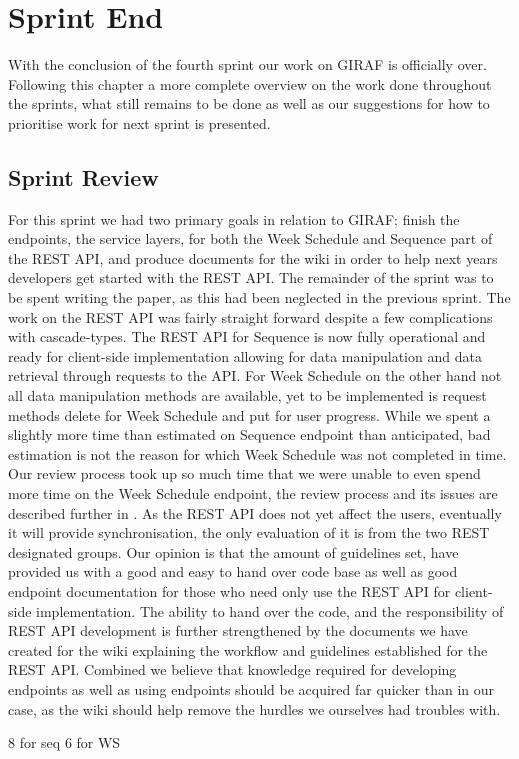 \chapter{Sprint End}
With the conclusion of the fourth sprint our work on GIRAF is officially over.
Following this chapter a more complete overview on the work done throughout the sprints, what still remains to be done as well as our suggestions for how to prioritise work for next sprint is presented.

\section{Sprint Review}
For this sprint we had two primary goals in relation to GIRAF; finish the endpoints, the service layers, for both the Week Schedule and Sequence part of the REST API, and produce documents for the wiki in order to help next years developers get started with the REST API.
The remainder of the sprint was to be spent writing the paper, as this had been neglected in the previous sprint.
The work on the REST API was fairly straight forward despite a few complications with cascade-types.
The REST API for Sequence is now fully operational and ready for client-side implementation allowing for data manipulation and data retrieval through requests to the API.
For Week Schedule on the other hand not all data manipulation methods are available, yet to be implemented is request methods delete for Week Schedule and put for user progress.
While we spent a slightly more time than estimated on Sequence endpoint than anticipated, bad estimation is not the reason for which Week Schedule was not completed in time.
Our review process took up so much time that we were unable to even spend more time on the Week Schedule endpoint, the review process and its issues are described further in .
As the REST API does not yet affect the users, eventually it will provide synchronisation, the only evaluation of it is from the two REST designated groups.
Our opinion is that the amount of guidelines set, have provided us with a good and easy to hand over code base as well as good endpoint documentation for those who need only use the REST API for client-side implementation.
The ability to hand over the code, and the responsibility of REST API development is further strengthened by the documents we have created for the wiki explaining the workflow and guidelines established for the REST API.
Combined we believe that knowledge required for developing endpoints as well as using endpoints should be acquired far quicker than in our case, as the wiki should help remove the hurdles we ourselves had troubles with.

8 for seq
6 for WS

%